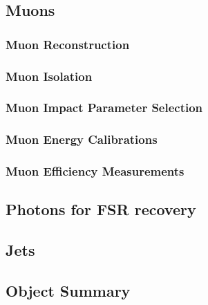 \clearpage

\subsection{Muons}

\subsubsection{Muon Reconstruction}
\label{sec:muonReco}


%

 \subsubsection{Muon Isolation}
 \label{sec:muoniso}
 

 \subsubsection{Muon Impact Parameter Selection}
 \label{sec:muSIP}
 

\subsubsection{Muon Energy Calibrations}
 

\subsubsection{Muon Efficiency Measurements}
\label{sec:muonEffMeas}



%

\clearpage

\subsection{Photons for FSR recovery}
\label{sec:FSRphotons}


\subsection{Jets}
\label{sec:jets}


\clearpage
\subsection{Object Summary}
\label{sec:objsum}

